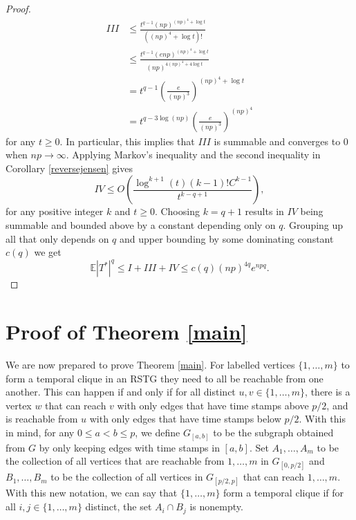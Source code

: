 \documentclass[11pt]{article}
\newcommand{\1}{\mathbf{1}} %
\newcommand{\ex}{\mathbb{E}} %
\begin{document}
\begin{proof}
\begin{align*}
III &\leq \frac{t^{q-1}(np)^{(np)^4 + \log t}}{((np)^4 + \log t)!} \\   
    &\leq \frac{t^{q-1}(enp)^{(np)^4 + \log t}}{(np)^{4(np)^4 + 4\log t}} \\
    &  = t^{q-1}\left( \frac{e}{(np)^3} \right)^{(np)^4 + \log t} \\
    &= t^{q-3\log(np)}\left(\frac{e}{(np)^3}\right)^{(np)^4}
\end{align*}
for any $t \geq 0$. In particular, this implies that $III$ is summable and converges to 0 when $np \to \infty$. Applying Markov's inequality and the second inequality in Corollary \ref{reversejensen} gives
$$IV \leq O\left( \frac{\log^{k+1} (t) ( k -1 )!
C^{k-1}
}{t^{k-q+1}}\right),$$
for any positive integer $k$ and $t \geq 0$. Choosing $k = q+1$ results in $IV$ being summable and bounded above by a constant depending only on $q$. Grouping up all that only depends on $q$ and upper bounding by some dominating constant $c(q)$ we get
$$\ex|T^*|^q \leq I + III + IV \leq c(q)(np)^{4q}e^{npq}.$$
\end{proof}



\section{Proof of Theorem \ref{main}}

We are now prepared to prove Theorem \ref{main}.
For labelled vertices $\{1,\ldots,m\}$ to form a temporal clique in an RSTG they need to all be reachable from one another. This can happen if and only if for all distinct $u,v \in \{1,\ldots,m\}$, there is a vertex $w$ that can reach $v$ with only edges that have time stamps above $p/2$, and is reachable from $u$ with only edges that have time stamps below $p/2$. With this in mind, for any $0\le a < b\le p$, we define $G_{[a,b]}$ to be the subgraph obtained from $G$ by only keeping edges with time stamps in $[a,b]$. Set $A_1,\ldots,A_m$ to be the collection of all vertices that are reachable from $1,\ldots,m$ in $G_{[0,p/2]}$ and $B_1,\ldots,B_m$ to be the collection of all vertices in $G_{[p/2,p]}$ that can reach $1,\ldots,m$. With this new notation, we can say that $\{1,\ldots,m\}$ form a temporal clique if for all $i,j \in \{1,\ldots,m\}$ distinct, the set $A_i \cap B_j$ is nonempty. 
\end{document}
